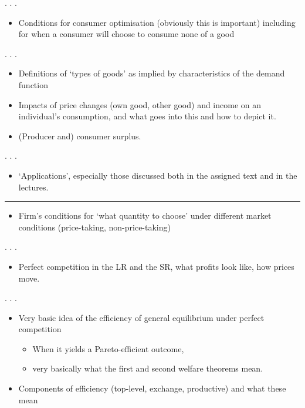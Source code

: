 \documentclass[]{article}
\providecommand{\tightlist}{%
  \setlength{\itemsep}{0pt}\setlength{\parskip}{0pt}}
\begin{document}
. . .

\begin{itemize}
\tightlist
\item
  Conditions for consumer optimisation (obviously this is important)
  including for when a consumer will choose to consume none of a good
\end{itemize}

\bigskip

. . .

\begin{itemize}
\item
  Definitions of `types of goods' as implied by characteristics of the
  demand function
\item
  Impacts of price changes (own good, other good) and income on an
  individual's consumption, and what goes into this and how to depict
  it.
\item
  (Producer and) consumer surplus.
\end{itemize}

. . .

\bigskip

\begin{itemize}
\tightlist
\item
  `Applications', especially those discussed both in the assigned text
  and in the lectures.
\end{itemize}

\begin{center}\rule{0.5\linewidth}{\linethickness}\end{center}

\begin{itemize}
\tightlist
\item
  Firm's conditions for `what quantity to choose' under different market
  conditions (price-taking, non-price-taking)
\end{itemize}

. . .

\bigskip

\begin{itemize}
\tightlist
\item
  Perfect competition in the LR and the SR, what profits look like, how
  prices move.
\end{itemize}

. . .

\begin{itemize}
\tightlist
\item
  Very basic idea of the efficiency of general equilibrium under perfect
  competition

  \begin{itemize}
  \item
    When it yields a Pareto-efficient outcome,
  \item
    very basically what the first and second welfare theorems mean.
  \end{itemize}
\item
  Components of efficiency (top-level, exchange, productive) and what
  these mean
\end{itemize}
\end{document}
